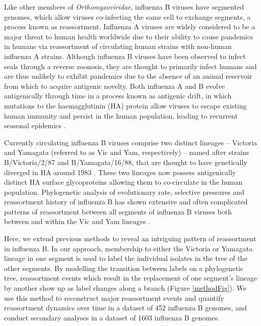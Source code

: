 \documentclass[11pt,oneside,letterpaper]{article}
\begin{document}
Like other members of \textit{Orthomyxoviridae}, influenza B viruses have segmented genomes, which allow viruses co-infecting the same cell to exchange segments, a process known as reassortment. 
Influenza A viruses are widely considered to be a major threat to human health worldwide due to their ability to cause pandemics in humans via reassortment of circulating human strains with non-human influenza A strains. 
Although influenza B viruses have been observed to infect seals \citep{osterhaus2000,bodewes2013} through a reverse zoonosis, they are thought to primarily infect humans and are thus unlikely to exhibit pandemics due to the absence of an animal reservoir from which to acquire antigenic novelty. 
Both influenza A and B evolve antigenically through time in a process known as antigenic drift, in which mutations to the haemagglutinin (HA) protein allow viruses to escape existing human immunity and persist in the human population, leading to recurrent seasonal epidemics \citep{burnet1955,hay2001,bedford2014}.

Currently circulating influenza B viruses comprise two distinct lineages -- Victoria and Yamagata (referred to as Vic and Yam, respectively) -- named after strains B/Victoria/2/87 and B/Yamagata/16/88, that are thought to have genetically diverged in HA around 1983 \citep{rota1990}. 
These two lineages now possess antigenically distinct HA surface glycoproteins \citep{kanegae1990,rota1990,nerome1998,nakagawa2002,ansaldi2003} allowing them to co-circulate in the human population.
Phylogenetic analysis of evolutionary rate, selective pressures and reassortment history of influenza B has shown extensive and often complicated patterns of reassortment between all segments of influenza B viruses both between and within the Vic and Yam lineages \citep{chen2008}.

Here, we extend previous methods to reveal an intriguing pattern of reassortment in influenza B.
In our approach, membership to either the Victoria or Yamagata lineage in one segment is used to label the individual isolates in the tree of the other segments.
By modelling the transition between labels on a phylogenetic tree, reassortment events which result in the replacement of one segment's lineage by another show up as label changes along a branch (Figure \ref{methodFig}).
We use this method to reconstruct major reassortment events and quantify reassortment dynamics over time in a dataset of 452 influenza B genomes, and conduct secondary analyses in a dataset of 1603 influenza B genomes.
\end{document}
